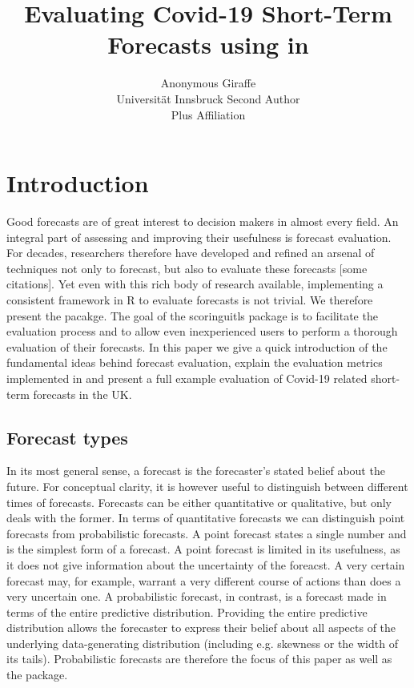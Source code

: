 \documentclass[article]{jss}
\author{Anonymous Giraffe\\Universit\"at Innsbruck \And 
        Second Author\\Plus Affiliation}
\title{Evaluating Covid-19 Short-Term Forecasts using \pkg{scoringutils} in \proglang{R}}
\begin{document}

\section[Introduction]{Introduction}
Good forecasts are of great interest to decision makers in almost every field. An integral part of assessing and improving their usefulness is forecast evaluation. For decades, researchers therefore have developed and refined an arsenal of techniques not only to forecast, but also to evaluate these forecasts [some citations]. Yet even with this rich body of research available, implementing a consistent framework in R to evaluate forecasts is not trivial. We therefore present the  pacakge. The goal of the scoringuitls package is to facilitate the evaluation process and to allow even inexperienced users to perform a thorough evaluation of their forecasts. In this paper we give a quick introduction of the fundamental ideas behind forecast evaluation, explain the evaluation metrics implemented in  and present a full example evaluation of Covid-19 related short-term forecasts in the UK. 

\subsection{Forecast types}

In its most general sense, a forecast is the forecaster’s stated belief about the future. For conceptual clarity, it is however useful to distinguish between different times of forecasts. Forecasts can be either quantitative or qualitative, but  only deals with the former. In terms of quantitative forecasts we can distinguish point forecasts from probabilistic forecasts. A point forecast states a single number and is the simplest form of a forecast. A point forecast is limited in its usefulness, as it does not give information about the uncertainty of the foreacst. A very certain forecast may, for example, warrant a very different course of actions than does a very uncertain one. A probabilistic forecast, in contrast, is a forecast made in terms of the entire predictive distribution. Providing the entire predictive distribution allows the forecaster to express their belief about all aspects of the underlying data-generating distribution (including e.g. skewness or the width of its tails). Probabilistic forecasts are therefore the focus of this paper as well as the  package. 
\end{document}
